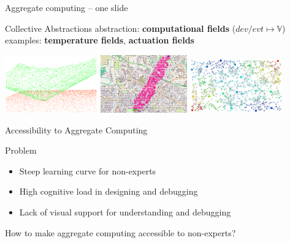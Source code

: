 \documentclass[aspectratio=169]{beamer}
\newcommand{\bo}[1]{\textbf{#1}}
\begin{document}
\begin{frame}[fragile]{Aggregate computing -- one slide}
{  
		\begin{exampleblock}{\footnotesize Collective Abstractions} %
			\scriptsize
		\alert{abstraction:} \bo{computational fields} ($\mathit{dev/evt} \mapsto \mathbb{V}$) \vspace{0.1cm}
			\alert{examples:} \bo{temperature fields}, \bo{actuation fields} \vspace{0.1cm}
			\begin{center}
				\includegraphics[width=0.3\textwidth]{img/3d-gradient.png}
				\includegraphics[width=0.28\textwidth]{img/channel.png}
				\includegraphics[width=0.3\textwidth]{img/scr-result.png}
				\end{center}
		\end{exampleblock}
 }
	
\end{frame}
\begin{frame}{Accessibility to Aggregate Computing}
	\begin{block}{Problem}
		\begin{itemize}
			\item \alert{Steep learning curve} for non-experts
			\item \alert{High cognitive load} in designing and debugging
			\item \alert{Lack of visual support} for understanding and debugging
		\end{itemize}
	\end{block}
	How to make aggregate computing accessible to non-experts?
\end{frame}
\end{document}
